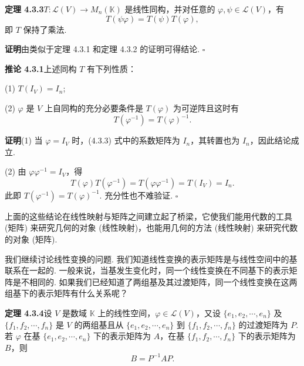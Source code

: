 \documentclass[UTF8,12pt,a4paper,fontset=fandol]{ctexart}
\begin{document}
\noindent\textbf{定理 4.3.3}\quad $T:\mathcal{L}(V)\to M_n(\mathbb{K})$ 是线性同构，并对任意的 $\varphi,\psi\in\mathcal{L}(V)$，有
\[
T(\psi\varphi)=T(\psi)T(\varphi),
\]
即 $T$ 保持了乘法.

\noindent\textbf{证明}\quad 由类似于定理 4.3.1 和定理 4.3.2 的证明可得结论. $\square$

\noindent\textbf{推论 4.3.1}\quad 上述同构 $T$ 有下列性质：

(1) $T(I_V)=I_n$;

(2) $\varphi$ 是 $V$ 上自同构的充分必要条件是 $T(\varphi)$ 为可逆阵且这时有
\[
T(\varphi^{-1})=T(\varphi)^{-1}.
\]

\noindent\textbf{证明}\quad (1) 当 $\varphi=I_V$ 时，(4.3.3) 式中的系数矩阵为 $I_n$，其转置也为 $I_n$，因此结论成立.

(2) 由 $\varphi\varphi^{-1}=I_V$，得
\[
T(\varphi)T(\varphi^{-1})=T(\varphi\varphi^{-1})=T(I_V)=I_n.
\]
此即 $T(\varphi^{-1})=T(\varphi)^{-1}$. 充分性也不难验证. $\square$

上面的这些结论在线性映射与矩阵之间建立起了桥梁，它使我们能用代数的工具 (矩阵) 来研究几何的对象 (线性映射)，也能用几何的方法 (线性映射) 来研究代数的对象 (矩阵).

我们继续讨论线性变换的问题. 我们知道线性变换的表示矩阵是与线性空间中的基联系在一起的. 一般来说，当基发生变化时，同一个线性变换在不同基下的表示矩阵是不相同的. 如果我们已经知道了两组基及其过渡矩阵，同一个线性变换在这两组基下的表示矩阵有什么关系呢？

\noindent\textbf{定理 4.3.4}\quad 设 $V$ 是数域 $\mathbb{K}$ 上的线性空间，$\varphi\in\mathcal{L}(V)$，又设 $\{e_1,e_2,\cdots,e_n\}$ 及 $\{f_1,f_2,\cdots,f_n\}$ 是 $V$ 的两组基且从 $\{e_1,e_2,\cdots,e_n\}$ 到 $\{f_1,f_2,\cdots,f_n\}$ 的过渡矩阵为 $P$. 若 $\varphi$ 在基 $\{e_1,e_2,\cdots,e_n\}$ 下的表示矩阵为 $A$，在基 $\{f_1,f_2,\cdots,f_n\}$ 下的表示矩阵为 $B$，则
\[
B=P^{-1}AP.
\]
\end{document}
